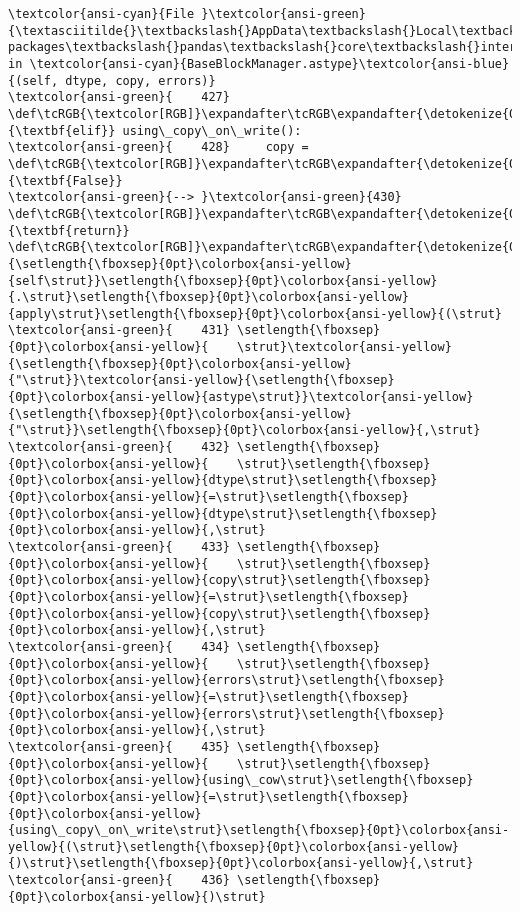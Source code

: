 \documentclass[11pt]{article}
\begin{document}
\begin{Verbatim}[commandchars=\\\{\}, frame=single, framerule=2mm, rulecolor=\color{outerrorbackground}]
\textcolor{ansi-cyan}{File }\textcolor{ansi-green}{\textasciitilde{}\textbackslash{}AppData\textbackslash{}Local\textbackslash{}Programs\textbackslash{}Python\textbackslash{}Python313\textbackslash{}Lib\textbackslash{}site-packages\textbackslash{}pandas\textbackslash{}core\textbackslash{}internals\textbackslash{}managers.py:430}, in \textcolor{ansi-cyan}{BaseBlockManager.astype}\textcolor{ansi-blue}{(self, dtype, copy, errors)}
\textcolor{ansi-green}{    427} \def\tcRGB{\textcolor[RGB]}\expandafter\tcRGB\expandafter{\detokenize{0,135,0}}{\textbf{elif}} using\_copy\_on\_write():
\textcolor{ansi-green}{    428}     copy = \def\tcRGB{\textcolor[RGB]}\expandafter\tcRGB\expandafter{\detokenize{0,135,0}}{\textbf{False}}
\textcolor{ansi-green}{--> }\textcolor{ansi-green}{430} \def\tcRGB{\textcolor[RGB]}\expandafter\tcRGB\expandafter{\detokenize{0,135,0}}{\textbf{return}} \def\tcRGB{\textcolor[RGB]}\expandafter\tcRGB\expandafter{\detokenize{0,135,0}}{\setlength{\fboxsep}{0pt}\colorbox{ansi-yellow}{self\strut}}\setlength{\fboxsep}{0pt}\colorbox{ansi-yellow}{.\strut}\setlength{\fboxsep}{0pt}\colorbox{ansi-yellow}{apply\strut}\setlength{\fboxsep}{0pt}\colorbox{ansi-yellow}{(\strut}
\textcolor{ansi-green}{    431} \setlength{\fboxsep}{0pt}\colorbox{ansi-yellow}{    \strut}\textcolor{ansi-yellow}{\setlength{\fboxsep}{0pt}\colorbox{ansi-yellow}{"\strut}}\textcolor{ansi-yellow}{\setlength{\fboxsep}{0pt}\colorbox{ansi-yellow}{astype\strut}}\textcolor{ansi-yellow}{\setlength{\fboxsep}{0pt}\colorbox{ansi-yellow}{"\strut}}\setlength{\fboxsep}{0pt}\colorbox{ansi-yellow}{,\strut}
\textcolor{ansi-green}{    432} \setlength{\fboxsep}{0pt}\colorbox{ansi-yellow}{    \strut}\setlength{\fboxsep}{0pt}\colorbox{ansi-yellow}{dtype\strut}\setlength{\fboxsep}{0pt}\colorbox{ansi-yellow}{=\strut}\setlength{\fboxsep}{0pt}\colorbox{ansi-yellow}{dtype\strut}\setlength{\fboxsep}{0pt}\colorbox{ansi-yellow}{,\strut}
\textcolor{ansi-green}{    433} \setlength{\fboxsep}{0pt}\colorbox{ansi-yellow}{    \strut}\setlength{\fboxsep}{0pt}\colorbox{ansi-yellow}{copy\strut}\setlength{\fboxsep}{0pt}\colorbox{ansi-yellow}{=\strut}\setlength{\fboxsep}{0pt}\colorbox{ansi-yellow}{copy\strut}\setlength{\fboxsep}{0pt}\colorbox{ansi-yellow}{,\strut}
\textcolor{ansi-green}{    434} \setlength{\fboxsep}{0pt}\colorbox{ansi-yellow}{    \strut}\setlength{\fboxsep}{0pt}\colorbox{ansi-yellow}{errors\strut}\setlength{\fboxsep}{0pt}\colorbox{ansi-yellow}{=\strut}\setlength{\fboxsep}{0pt}\colorbox{ansi-yellow}{errors\strut}\setlength{\fboxsep}{0pt}\colorbox{ansi-yellow}{,\strut}
\textcolor{ansi-green}{    435} \setlength{\fboxsep}{0pt}\colorbox{ansi-yellow}{    \strut}\setlength{\fboxsep}{0pt}\colorbox{ansi-yellow}{using\_cow\strut}\setlength{\fboxsep}{0pt}\colorbox{ansi-yellow}{=\strut}\setlength{\fboxsep}{0pt}\colorbox{ansi-yellow}{using\_copy\_on\_write\strut}\setlength{\fboxsep}{0pt}\colorbox{ansi-yellow}{(\strut}\setlength{\fboxsep}{0pt}\colorbox{ansi-yellow}{)\strut}\setlength{\fboxsep}{0pt}\colorbox{ansi-yellow}{,\strut}
\textcolor{ansi-green}{    436} \setlength{\fboxsep}{0pt}\colorbox{ansi-yellow}{)\strut}


\end{Verbatim}
\end{document}
